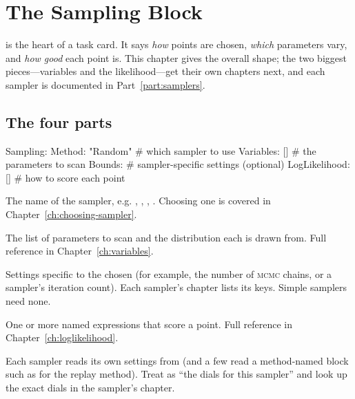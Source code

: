 \chapter{The Sampling Block}
\label{ch:sampling-block}

 is the heart of a task card. It says \emph{how} points
are chosen, \emph{which} parameters vary, and \emph{how good} each point is. This chapter gives
the overall shape; the two biggest pieces---variables and the likelihood---get their own
chapters next, and each sampler is documented in Part~\ref{part:samplers}.

\section{The four parts}
\label{sec:sampling-parts}

\begin{yamlwin}
Sampling:
  Method: "Random"      # which sampler to use
  Variables: []         # the parameters to scan
  Bounds: {}            # sampler-specific settings (optional)
  LogLikelihood: []     # how to score each point
\end{yamlwin}

\begin{description}[style=nextline, leftmargin=1.2em]
  \item[\yamlkey{Method}] The name of the sampler, e.g. , ,
        , . Choosing one is covered in
        Chapter~\ref{ch:choosing-sampler}.
  \item[\yamlkey{Variables}] The list of parameters to scan and the distribution each is drawn
        from. Full reference in Chapter~\ref{ch:variables}.
  \item[\yamlkey{Bounds}] Settings specific to the chosen  (for example, the
        number of \textsc{mcmc} chains, or a sampler's iteration count). Each sampler's chapter
        lists its keys. Simple samplers need none.
  \item[\yamlkey{LogLikelihood}] One or more named expressions that score a point. Full
        reference in Chapter~\ref{ch:loglikelihood}.
\end{description}

\begin{jnote}
Each sampler reads its own settings from  (and a few read a method-named block
such as  for the  replay method). Treat  as ``the
dials for this sampler'' and look up the exact dials in the sampler's chapter.
\end{jnote}

